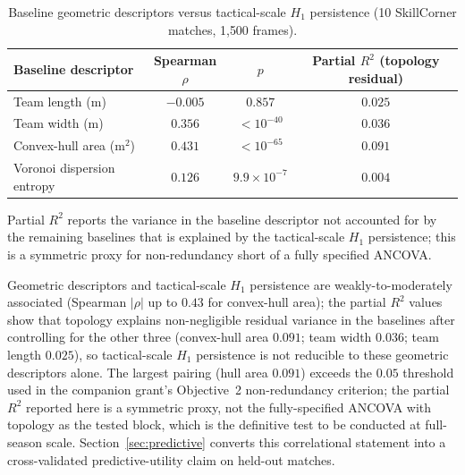 \begin{table}[H]
  \centering
  \begin{threeparttable}
    \caption{Baseline geometric descriptors versus tactical-scale \(H_1\) persistence (10 SkillCorner matches, 1{,}500 frames).}
    \label{tab:baseline}
    \begin{tabular}{@{}lccc@{}}
      \toprule
      Baseline descriptor & Spearman \(\rho\) & \(p\) & Partial \(R^2\) (topology residual) \\
      \midrule
      Team length (m)                  & \(-0.005\) & \(0.857\) & \(0.025\) \\
      Team width (m)                   & \(0.356\) & \(<10^{-40}\) & \(0.036\) \\
      Convex-hull area (m\(^2\))       & \(0.431\) & \(<10^{-65}\) & \(0.091\) \\
      Voronoi dispersion entropy      & \(0.126\) & \(9.9\times10^{-7}\) & \(0.004\) \\
      \bottomrule
    \end{tabular}
    \begin{tablenotes}
      \small
      \item Partial \(R^2\) reports the variance in the baseline descriptor not accounted for by the remaining baselines that is explained by the tactical-scale \(H_1\) persistence; this is a symmetric proxy for non-redundancy short of a fully specified ANCOVA.
    \end{tablenotes}
  \end{threeparttable}
\end{table}

Geometric descriptors and tactical-scale \(H_1\) persistence are weakly-to-moderately associated (Spearman $|\rho|$ up to $0.43$ for convex-hull area); the partial \(R^2\) values show that topology explains non-negligible residual variance in the baselines after controlling for the other three (convex-hull area $0.091$; team width $0.036$; team length $0.025$), so tactical-scale \(H_1\) persistence is not reducible to these geometric descriptors alone. The largest pairing (hull area $0.091$) exceeds the $0.05$ threshold used in the companion grant's Objective~2 non-redundancy criterion; the partial \(R^2\) reported here is a symmetric proxy, not the fully-specified ANCOVA with topology as the tested block, which is the definitive test to be conducted at full-season scale. Section~\ref{sec:predictive} converts this correlational statement into a cross-validated predictive-utility claim on held-out matches.

